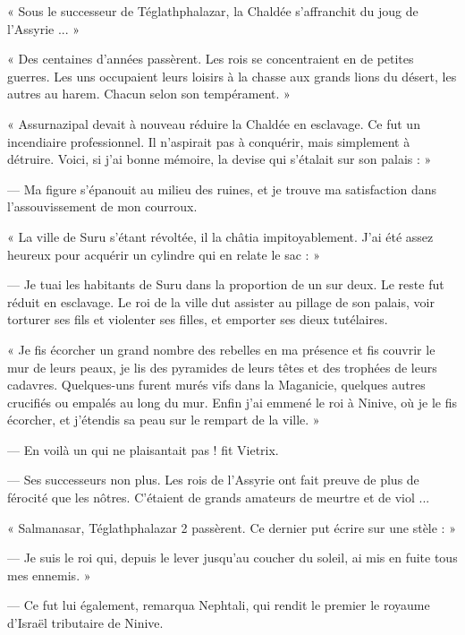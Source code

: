 \documentclass[a4paper, 11pt, oneside, polutonikogreek, french]{article}
\begin{document}
« Sous le successeur de Téglathphalazar, la Chaldée s'affranchit du joug de l'Assyrie ... »

\bigskip
\centerline{\EightStarTaper}
\centerline{\EightStarTaper\EightStarTaper}
\bigskip

« Des centaines d'années passèrent. Les rois se concentraient en de petites guerres. Les uns occupaient leurs loisirs à la chasse aux grands lions du désert, les autres au harem. Chacun selon son tempérament. »

« Assurnazipal devait à nouveau réduire la Chaldée en esclavage. Ce fut un incendiaire professionnel. Il n'aspirait pas à conquérir, mais simplement à détruire. Voici, si j'ai bonne mémoire, la devise qui s'étalait sur son palais : »

--- Ma figure s'épanouit au milieu des ruines, et je trouve ma satisfaction dans l'assouvissement de mon courroux.

« La ville de Suru s'étant révoltée, il la châtia impitoyablement. J'ai été assez heureux pour acquérir un cylindre qui en relate le sac : »

--- Je tuai les habitants de Suru dans la proportion de un sur deux. Le reste fut réduit en esclavage. Le roi de la ville dut assister au pillage de son palais, voir torturer ses fils et violenter ses filles, et emporter ses dieux tutélaires.

« Je fis écorcher un grand nombre des rebelles en ma présence et fis couvrir le mur de leurs peaux, je lis des pyramides de leurs têtes et des trophées de leurs cadavres. Quelques-uns furent murés vifs dans la Maganicie, quelques autres crucifiés ou empalés au long du mur. Enfin j'ai emmené le roi à Ninive, où je le fis écorcher, et j'étendis sa peau sur le rempart de la ville. »

--- En voilà un qui ne plaisantait pas ! fit Vietrix.

--- Ses successeurs non plus. Les rois de l'Assyrie ont fait preuve de plus de férocité que les nôtres. C'étaient de grands amateurs de meurtre et de viol ...

\bigskip
\centerline{\EightStarTaper}
\centerline{\EightStarTaper\EightStarTaper}
\bigskip

« Salmanasar, Téglathphalazar 2 passèrent. Ce dernier put écrire sur une stèle : »

--- Je suis le roi qui, depuis le lever jusqu'au coucher du soleil, ai mis en fuite tous mes ennemis. »

--- Ce fut lui également, remarqua Nephtali, qui rendit le premier le royaume d'Israël tributaire de Ninive.
\end{document}

